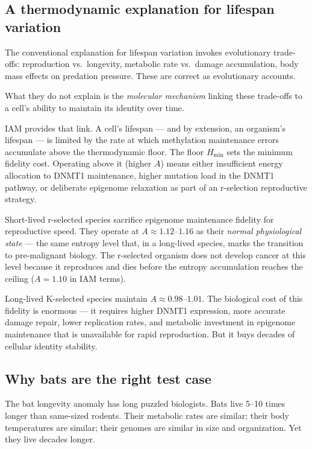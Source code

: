 \documentclass[11pt,a4paper]{article}
\newcommand{\Hmin}{H_{\min}}
\newcommand{\Ascore}{A}
\begin{document}
\subsection{A thermodynamic explanation for lifespan variation}

The conventional explanation for lifespan variation invokes evolutionary
trade-offs: reproduction vs.\ longevity, metabolic rate vs.\ damage
accumulation, body mass effects on predation pressure. These are correct
as evolutionary accounts.

What they do not explain is the \emph{molecular mechanism} linking
these trade-offs to a cell's ability to maintain its identity over time.

IAM provides that link. A cell's lifespan --- and by extension, an organism's
lifespan --- is limited by the rate at which methylation maintenance errors
accumulate above the thermodynamic floor. The floor $\Hmin$ sets the minimum
fidelity cost. Operating above it (higher $\Ascore$) means either insufficient
energy allocation to DNMT1 maintenance, higher mutation load in the DNMT1 pathway,
or deliberate epigenome relaxation as part of an r-selection reproductive strategy.

Short-lived r-selected species sacrifice epigenome maintenance fidelity for
reproductive speed. They operate at $\Ascore \approx 1.12$--$1.16$ as their
\emph{normal physiological state} --- the same entropy level that, in a long-lived
species, marks the transition to pre-malignant biology. The r-selected organism
does not develop cancer at this level because it reproduces and dies before
the entropy accumulation reaches the ceiling ($\Ascore = 1.10$ in IAM terms).

Long-lived K-selected species maintain $\Ascore \approx 0.98$--$1.01$.
The biological cost of this fidelity is enormous --- it requires higher DNMT1
expression, more accurate damage repair, lower replication rates, and metabolic
investment in epigenome maintenance that is unavailable for rapid reproduction.
But it buys decades of cellular identity stability.

\subsection{Why bats are the right test case}

The bat longevity anomaly has long puzzled biologists. Bats live 5--10 times
longer than same-sized rodents. Their metabolic rates are similar; their
body temperatures are similar; their genomes are similar in size and organization.
Yet they live decades longer.
\end{document}
